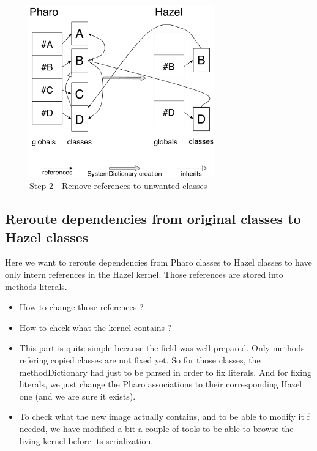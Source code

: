 \begin{figure}[ht]
	\centering\includegraphics[width = 8cm]{figures/CleaningUnnecessaryRefWithInh}
	\caption{Step 2 - Remove references to unwanted classes}
	\label{RemoveDependencies}
\end{figure}

\newpage
\subsection{Reroute dependencies from original classes to Hazel classes}

\goal Here we want to reroute dependencies from \gls{Pharo} classes to Hazel classes to have only intern references in the Hazel kernel. Those references are stored into methods literals.

\problems
\begin{itemize}
	\item How to change those references ?
	\item How to check what the kernel contains ?
\end{itemize}

\solutions 
\begin{itemize}
	\item This part is quite simple because the field was well prepared. Only methods refering copied classes are not fixed yet. So for those classes, the methodDictionary had just to be parsed in order to fix literals. And for fixing literals, we just change the \gls{Pharo} associations to their corresponding Hazel one (and we are sure it exists).
	\item To check what the new image actually contains, and to be able to modify it f needed, we have modified a bit a couple of tools to be able to browse the living kernel before its serialization.
\end{itemize}

